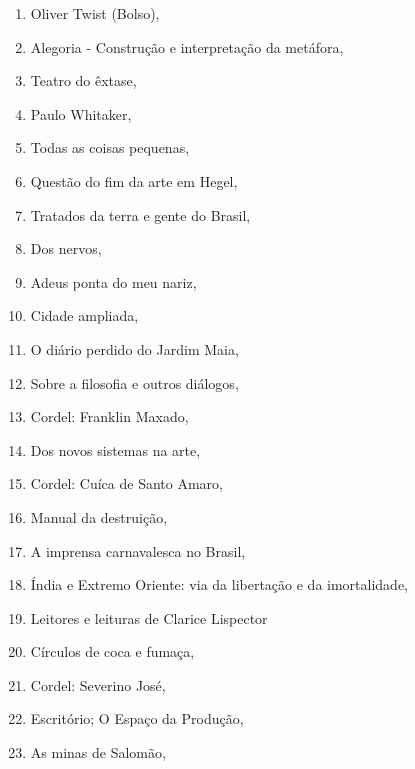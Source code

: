 \begin{multicols}{2}
\begin{enumerate}
\item Oliver Twist (Bolso), {}
\item Alegoria - Construção e interpretação da metáfora, {}
\item Teatro do êxtase, {}
\item Paulo Whitaker, {}
\item Todas as coisas pequenas, {}
\item Questão do fim da arte em Hegel, {}
\item Tratados da terra e gente do Brasil, {}
\item Dos nervos, {}
\item Adeus ponta do meu nariz, {}
\item Cidade ampliada, {}
\item O diário perdido do Jardim Maia, {}
\item Sobre a filosofia e outros diálogos, {}
\item Cordel: Franklin Maxado, {}
\item Dos novos sistemas na arte, {}
\item Cordel: Cuíca de Santo Amaro, {}
\item Manual da destruição, {}
\item A imprensa carnavalesca no Brasil, {}
\item Índia e Extremo Oriente: via da libertação e da imortalidade, {}
\item Leitores e leituras de Clarice Lispector
\item Círculos de coca e fumaça, {}
\item Cordel: Severino José, {}
\item Escritório; O Espaço da Produção, {}
\item As minas de Salomão, {}

\end{enumerate}
\end{multicols}

